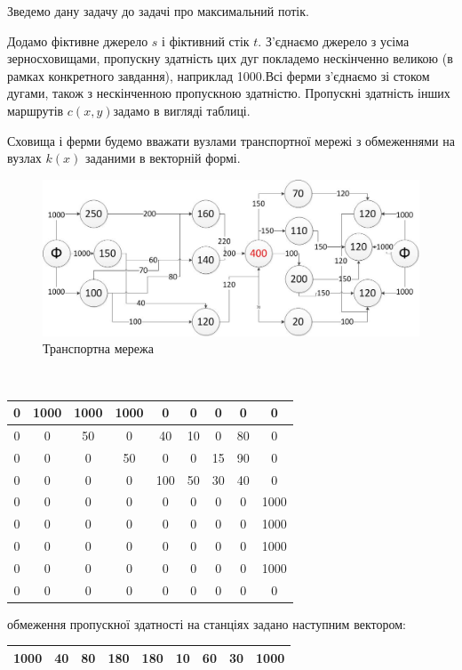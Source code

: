 \documentclass[a4paper,14pt,russian,ukrainian,oneside,final]{extreport}
\begin{document}
\indent
Зведемо дану задачу до задачі про максимальний потік.
\par Додамо фіктивне джерело $s$ і фіктивний стік $t$. З'єднаємо джерело з усіма зерносховищами, пропускну здатність цих дуг покладемо нескінченно великою (в рамках конкретного завдання), наприклад 1000.Всі ферми з'єднаємо зі стоком дугами, також з нескінченною пропускною здатністю. Пропускні здатність інших маршрутів $c(x,y)$задамо в вигляді таблиці.
\par Сховища і ферми будемо вважати вузлами транспортної мережі з обмеженнями на вузлах $k(x)$ заданими в векторній формі.
\begin{figure}[h]
\begin{center}
\includegraphics[scale=0.65]{p4.jpg}
\caption{Транспортна мережа}
\end{center}
\end{figure}
\\
\begin{center}
\begin{tabular}{|c|c|c|c||c|c|c|c|c|}
\hline
0&1000&1000&1000&0&0&0&0&0 \\ \hline
0&0&50&0&40&10&0&80&0 \\ \hline
0&0&0&50&0&0&15&90&0 \\ \hline
0&0&0&0&100&50&30&40&0 \\ \hline \hline
0&0&0&0&0&0&0&0&1000 \\ \hline
0&0&0&0&0&0&0&0&1000 \\ \hline
0&0&0&0&0&0&0&0&1000 \\ \hline
0&0&0&0&0&0&0&0&1000 \\ \hline
0&0&0&0&0&0&0&0&0 \\ \hline
\end{tabular}
\end{center}
обмеження пропускної здатності на станціях задано наступним вектором:
\begin{center}
\begin{tabular}{|c|c|c|c||c|c|c|c|c|}
\hline
1000&40&80&180&180&10&60&30&1000  \\
\hline
\end{tabular}
\end{center}
\end{document}

